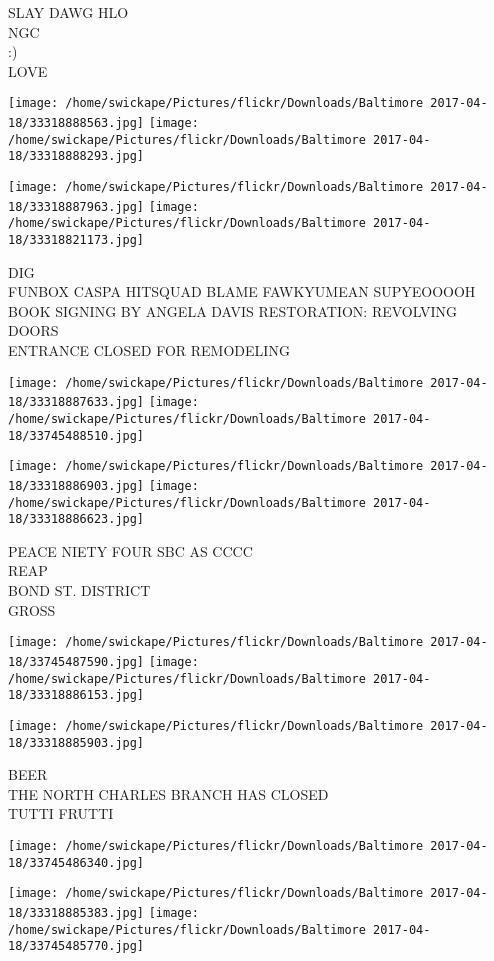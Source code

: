 \documentclass[10pt,letterpaper]{article}
\begin{document}
SLAY DAWG HLO\\
NGC\\
:)\\
LOVE
\pagebreak

\texttt{[image: /home/swickape/Pictures/flickr/Downloads/Baltimore 2017-04-18/33318888563.jpg]}
\texttt{[image: /home/swickape/Pictures/flickr/Downloads/Baltimore 2017-04-18/33318888293.jpg]}

\texttt{[image: /home/swickape/Pictures/flickr/Downloads/Baltimore 2017-04-18/33318887963.jpg]}
\texttt{[image: /home/swickape/Pictures/flickr/Downloads/Baltimore 2017-04-18/33318821173.jpg]}

DIG\\
FUNBOX CASPA HITSQUAD BLAME FAWKYUMEAN SUPYEOOOOH\\
BOOK SIGNING BY ANGELA DAVIS RESTORATION: REVOLVING DOORS\\
ENTRANCE CLOSED FOR REMODELING
\pagebreak

\texttt{[image: /home/swickape/Pictures/flickr/Downloads/Baltimore 2017-04-18/33318887633.jpg]}
\texttt{[image: /home/swickape/Pictures/flickr/Downloads/Baltimore 2017-04-18/33745488510.jpg]}

\texttt{[image: /home/swickape/Pictures/flickr/Downloads/Baltimore 2017-04-18/33318886903.jpg]}
\texttt{[image: /home/swickape/Pictures/flickr/Downloads/Baltimore 2017-04-18/33318886623.jpg]}

PEACE NIETY FOUR SBC AS CCCC\\
REAP\\
BOND ST. DISTRICT\\
GROSS
\pagebreak

\texttt{[image: /home/swickape/Pictures/flickr/Downloads/Baltimore 2017-04-18/33745487590.jpg]}
\texttt{[image: /home/swickape/Pictures/flickr/Downloads/Baltimore 2017-04-18/33318886153.jpg]}

\texttt{[image: /home/swickape/Pictures/flickr/Downloads/Baltimore 2017-04-18/33318885903.jpg]}

BEER\\
THE NORTH CHARLES BRANCH HAS CLOSED\\
TUTTI FRUTTI
\pagebreak

\texttt{[image: /home/swickape/Pictures/flickr/Downloads/Baltimore 2017-04-18/33745486340.jpg]}

\vspace{0.25in}
\texttt{[image: /home/swickape/Pictures/flickr/Downloads/Baltimore 2017-04-18/33318885383.jpg]}
\texttt{[image: /home/swickape/Pictures/flickr/Downloads/Baltimore 2017-04-18/33745485770.jpg]}
\end{document}
